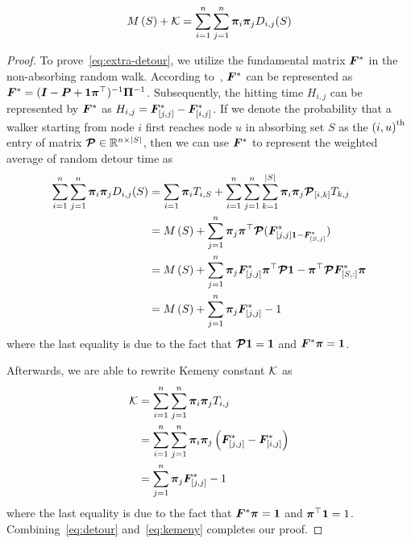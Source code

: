\documentclass[sigconf]{acmart}
\begin{document}
\begin{theorem}\label{thm:extra_detour}
    \begin{equation}\label{eq:extra-detour}
        M\left(S\right)+\mathcal{K}=\sum_{i=1}^n\sum_{j=1}^n\boldsymbol{\pi}_i\boldsymbol{\pi}_jD_{i,j}(S)
    \end{equation}
\end{theorem}
\begin{proof}
    To prove~\eqref{eq:extra-detour}, we utilize the fundamental matrix \(\boldsymbol{F}^*\) in the non-absorbing random walk.
    According to~\cite{BoRaZh11}, \(\boldsymbol{F}^*\) can be represented as \(\boldsymbol{F}^*=(\boldsymbol{I}-\boldsymbol{P}+\boldsymbol{1}\boldsymbol{\pi}^\top)^{-1}\boldsymbol{\Pi}^{-1}\).
    Subsequently, the hitting time \(H_{i,j}\) can be represented by \(\boldsymbol{F}^*\) as \(H_{i,j}=\boldsymbol{F}^*_{[j,j]}-\boldsymbol{F}^*_{[i,j]}\).
    If we denote the probability that a walker starting from node \(i\) first reaches node \(u\) in absorbing set \(S\) as the \({(i,u)}^{\rm{th}}\) entry of matrix \(\boldsymbol{\mathcal{P}}\in\mathbb{R}^{n\times\left|S \right|}\), then we can use \(\boldsymbol{F}^*\) to represent the weighted average of random detour time as
    \begin{equation}\label{eq:detour}
        \begin{split}
            \sum_{i=1}^n\sum_{j=1}^n\boldsymbol{\pi}_i\boldsymbol{\pi}_jD_{i,j}(S)
            & =\sum_{i=1}\boldsymbol{\pi}_i T_{i,S}+\sum_{i=1}^n\sum_{j=1}^n\sum_{k=1}^{\left|S \right|}\boldsymbol{\pi}_i\boldsymbol{\pi}_j\boldsymbol{\mathcal{P}}_{[i,k]}T_{k,j}  \\
            & =M\left(S\right)+\sum_{j=1}^n\boldsymbol{\pi}_j\boldsymbol{\pi}^\top\boldsymbol{\mathcal{P}}(\boldsymbol{F}^*_{[j,j]\boldsymbol{1}-\boldsymbol{F}^*_{[S,j]}})                        \\
            & =M\left(S\right)+\sum_{j=1}^n\boldsymbol{\pi}_j\boldsymbol{F}^*_{[j,j]}\boldsymbol{\pi}^\top\boldsymbol{\mathcal{P}}\boldsymbol{1}-\boldsymbol{\pi}^\top\boldsymbol{\mathcal{P}}\boldsymbol{F}^*_{[S,:]}\boldsymbol{\pi} \\
            & =M\left(S\right)+\sum_{j=1}^n\boldsymbol{\pi}_j\boldsymbol{F}^*_{[j,j]}-1
        \end{split}
    \end{equation}
    where the last equality is due to the fact that \(\boldsymbol{\mathcal{P}}\boldsymbol{1}=\boldsymbol{1}\) and \(\boldsymbol{F}^*\boldsymbol{\pi}=\boldsymbol{1}\).

    Afterwards, we are able to rewrite Kemeny constant \(\mathcal{K}\) as
    \begin{equation}\label{eq:kemeny}
        \begin{split}
            \mathcal{K}&=\sum_{i=1}^n\sum_{j=1}^n\boldsymbol{\pi}_i\boldsymbol{\pi}_jT_{i,j}\\
            &=\sum_{i=1}^n\sum_{j=1}^n\boldsymbol{\pi}_i\boldsymbol{\pi}_j\left( \boldsymbol{F}^*_{[j,j]}-\boldsymbol{F}^*_{[i,j]} \right)\\
            &=\sum_{j=1}^n\boldsymbol{\pi}_j\boldsymbol{F}^*_{[j,j]}-1
        \end{split}
    \end{equation}
    where the last equality is due to the fact that \(\boldsymbol{F}^*\boldsymbol{\pi}=\boldsymbol{1}\) and \(\boldsymbol{\pi}^\top\boldsymbol{1}=1\).
    Combining~\eqref{eq:detour} and~\eqref{eq:kemeny} completes our proof.
\end{proof}
\end{document}
